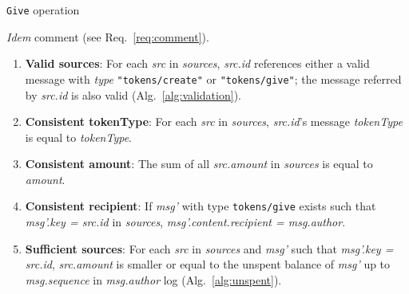 \documentclass[sigplan,screen,10pt]{acmart}
\newcommand\idemcomment[0]{
\begin{flushleft}
{\color{commentgray} \textit{Idem} comment (see Req.~\ref{req:comment}).}
\end{flushleft}}
\begin{document}
\begin{invariants}[hb]
    \caption{\texttt{Give} operation}
    \label{alg:give}
    \idemcomment
    \begin{enumerate}[label={G\arabic*},leftmargin=*]
        
          \item \textbf{Valid sources}: For each \textit{src} in \textit{sources}, \textit{src.id} references either a valid message with \textit{type} \texttt{"tokens/create"} or \texttt{"tokens/give"}; the message referred by \textit{src.id} is also valid (Alg.~\ref{alg:validation}).  \label{alg:give:valid}
          \item \textbf{Consistent tokenType}: For each \textit{src} in \textit{sources}, \textit{src.id}'s message \textit{tokenType} is equal to \textit{tokenType}. \label{alg:give:consistent-tokentype}
          \item \textbf{Consistent amount}: The sum of all \textit{src.amount} in \textit{sources} is equal to \textit{amount}. \label{alg:give:consistent-amount}
          \item \textbf{Consistent recipient}: If \textit{msg'} with type \texttt{tokens/give} exists such that \textit{msg'.key = src.id} in \textit{sources}, \textit{msg'.content.recipient = msg.author}. \label{alg:give:consistent-recipient}
           \item \textbf{Sufficient sources}: For each \textit{src} in \textit{sources} and \textit{msg'} such that \textit{msg'.key = src.id},    \textit{src.amount} is smaller or equal to the unspent balance of \textit{msg'} up to \textit{msg.sequence} in \textit{msg.author} log (Alg.~\ref{alg:unspent}). \label{alg:give:sufficient}
    \end{enumerate}
\end{invariants}
\end{document}
